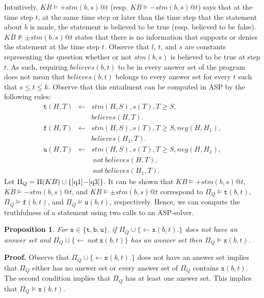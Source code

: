 \documentclass{article}
\newtheorem{proposition}[theorem]{Proposition}
\def\naf{\: {not} \:}
\begin{document}
Intuitively, $KB  \models {+}stm(b,s)@t$ (resp. $KB  \models {-}stm(b,s)@t$) says that at the time step $t$, at the same time step or later than the time step that the statement about $b$ is made, the statement is believed to be true (resp. believed to be false). $KB \not\models {\pm}stm(b,s)@t$ states that there is no information that supports or denies the statement at the time step $t$. Observe that $l$, $t$, and $s$ are constants representing the question whether or not $stm(b,s)$ is believed to be true at step $t$. As such, requiring $believes(b,t)$ to be in every answer set of the program 
does not mean that $believes(b,t)$ belongs to every answer set for every $t$ such that $s \le t \le k$. 
Observe that this entailment can be computed in ASP by the following rules: 
%
{
\begin{eqnarray}
\mathtt{t}(H, T) & \leftarrow & stm(H, S), s(T), T \ge S, \nonumber \\
        &  & believes(H, T). \label{q1} \\ 
\mathtt{f}(H, T) & \leftarrow & stm(H, S), s(T), T \ge S, neg(H,H_1),  \nonumber\\ 
& & believes(H_1, T).  \label{q2}\\
\mathtt{u}(H, T) & \leftarrow & stm(H, S), s(T), T \ge S, neg(H,H_1), \nonumber  \\
& & \naf believes(H, T), \nonumber \\
&&  \naf believes(H_1, T). \label{q3}
\end{eqnarray}
}
%
Let $\Pi_Q = \Pi(KB) \cup \{\eqref{q1}{-}\eqref{q3}\}$. It can be shown that 
 $KB  \models {+}stm(b,s)@t$, $KB  \models {-}stm(b,s)@t$, and  $KB  \models {\pm}stm(b,s)@t$ 
 correspond to $\Pi_Q \models \mathtt{t}(b,t)$, $\Pi_Q \models \mathtt{f}(b,t)$, and 
 $\Pi_Q \models \mathtt{u}(b,t)$, respectively. Hence, we can compute the truthfulness of a statement 
using two calls to an ASP-solver. 
 

\begin{proposition} 
For $\mathtt{x} \in \{\mathtt{t, b, u}\}$,
if  $\Pi_Q \cup \{\leftarrow  \mathtt{x}(b,t).\}$ does not have an answer set and  
$\Pi_Q \cup \{\leftarrow \naf \mathtt{x}(b,t)\}$   has an answer set then   $\Pi_Q \models \mathtt{x}(b, t)$. 
\end{proposition}  
% 
\noindent
{\bf Proof.}
Observe that $\Pi_Q \cup \{\leftarrow \mathtt{x}(b,t).\}$ does not have an answer set 
implies that $\Pi_Q$ either has no answer set or every answer set of $\Pi_Q$
contains $\mathtt{x}(b,t)$. The second condition implies that $\Pi_Q$ has at least one answer set. 
This implies that  $\Pi_Q \models \mathtt{x}(b, t)$.  
\hfill\qedsymbol{}
\end{document}
